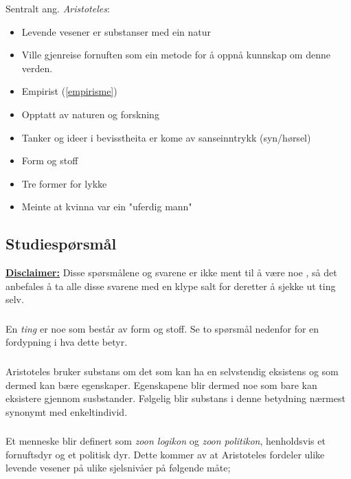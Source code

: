 \documentclass[a4paper]{IEEEtran}
\begin{document}
Sentralt ang. \textit{Aristoteles}:
\begin{itemize}\bigskip
    \item Levende vesener er substanser med ein natur
    \item Ville gjenreise fornuften som ein metode for å oppnå kunnskap om denne verden.
    \item Empirist (\ref{empirisme})
    \item Opptatt av naturen og forskning
    \item Tanker og ideer i bevisstheita er kome av sanseinntrykk (syn/hørsel)
    \item Form og stoff 
    \item Tre former for lykke
    \item Meinte at kvinna var ein "uferdig mann"
    
\end{itemize}\bigskip

    \subsection{Studiespørsmål}
     \underline{\textbf{Disclaimer:}} Disse spørsmålene og svarene er ikke ment til
     å være noe , så det anbefales å ta 
     alle disse svarene med en klype salt for deretter å sjekke ut ting selv.

        \subsubsection{}
        En \textit{ting} er noe som består av form og stoff. Se to spørsmål 
        nedenfor for en fordypning i hva dette betyr. \medskip

        \subsubsection{}
        Aristoteles bruker substans om det som kan ha en selvstendig 
        eksistens og som dermed kan bære egenskaper. Egenskapene blir dermed 
        noe som bare kan eksistere gjennom susbstander. Følgelig blir 
        substans i denne betydning nærmest synonymt med enkeltindivid. 
        \cite{snl_substans} \medskip

        \subsubsection{}
        Et menneske blir definert som \textit{zoon logikon} og \textit{zoon politikon},
        henholdsvis et fornuftsdyr og et politisk dyr. Dette kommer av at 
        Aristoteles fordeler ulike levende vesener på ulike sjelsnivåer på følgende
        måte;
\end{document}
